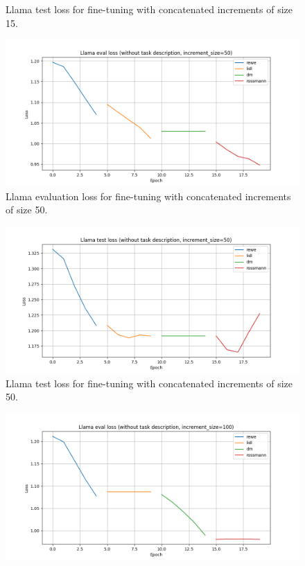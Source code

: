 \documentclass[licencjacka,en]{pracamgr}
\begin{document}
\begin{appendices}
\begin{figure}[h]
    \caption{Llama test loss for fine-tuning with concatenated increments of size 15.}
    \label{fig:llama-inc-tot-15-test}
\end{figure}
\begin{figure}[h]
    \centering
    \includegraphics[width=0.8\linewidth]{bachelor_images/llama_ft/llama-inc-50-tot-eval.png}
    \caption{Llama evaluation loss for fine-tuning with concatenated increments of size 50.}
    \label{fig:llama-inc-tot-50-eval}
\end{figure}
\begin{figure}[h]
    \centering
    \includegraphics[width=0.8\linewidth]{bachelor_images/llama_ft/llama-inc-50-tot-test.png}
    \caption{Llama test loss for fine-tuning with concatenated increments of size 50.}
    \label{fig:llama-inc-tot-50-test}
\end{figure}
\begin{figure}[h]
    \centering
    \includegraphics[width=0.8\linewidth]{bachelor_images/llama_ft/llama-inc-100-tot-eval.png}

\end{figure}
\end{appendices}
\end{document}
